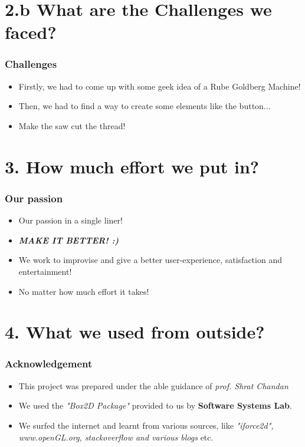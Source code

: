\documentclass{beamer}
\begin{document}
\section{2.b What are the Challenges we faced?} 
\begin{frame}
\frametitle{Challenges} \begin{itemize}
   \item Firstly, we had to come up with some geek idea of a Rube Goldberg Machine! \pause
   \item Then, we had to find a way to create some elements like the button... \pause
   \item Make the saw cut the thread! 
\end{itemize}
\end{frame}


\section{3. How much effort we put in?}
\begin{frame}
\frametitle{Our passion} 
\begin{itemize}
   \item Our passion in a single liner!\pause
   \item \textbf{\emph{MAKE IT BETTER! :)}} \pause
   \item We work to improvise and give a better user-experience, satisfaction and entertainment!\pause
   \item No matter how much effort it takes!
\end{itemize} 
\end{frame}

\section{4. What we used from outside?}
\begin{frame}
\frametitle{Acknowledgement} 
\begin{itemize}
   \item This project was prepared under the able guidance of \emph{prof. Shrat Chandan}
   \item We used the \emph{"Box2D Package"} provided to us by \textbf{Software Systems Lab}.
   \item We surfed the internet and learnt from various sources, like 
\emph{"iforce2d", www.openGL.org, stackoverflow and various blogs} etc.
\end{itemize} 
\end{frame}
\end{document}
